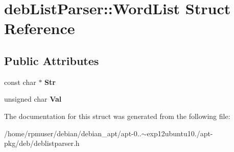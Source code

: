 \section{deb\-List\-Parser\-:\-:\-Word\-List \-Struct \-Reference}
\label{structdebListParser_1_1WordList}
\subsection*{\-Public \-Attributes}
\begin{DoxyCompactItemize}
\item 
const char $\ast$ {\bfseries \-Str}\label{structdebListParser_1_1WordList_a83ddceec53599310a13048586c0a8586}

\item 
unsigned char {\bfseries \-Val}\label{structdebListParser_1_1WordList_a5822b7000f077dc1e2f88a31a6b89a39}

\end{DoxyCompactItemize}


\-The documentation for this struct was generated from the following file\-:\begin{DoxyCompactItemize}
\item 
/home/rpmuser/debian/debian\-\_\-apt/apt-\/0..$\sim$exp12ubuntu10./apt-\/pkg/deb/deblistparser.\-h\end{DoxyCompactItemize}

